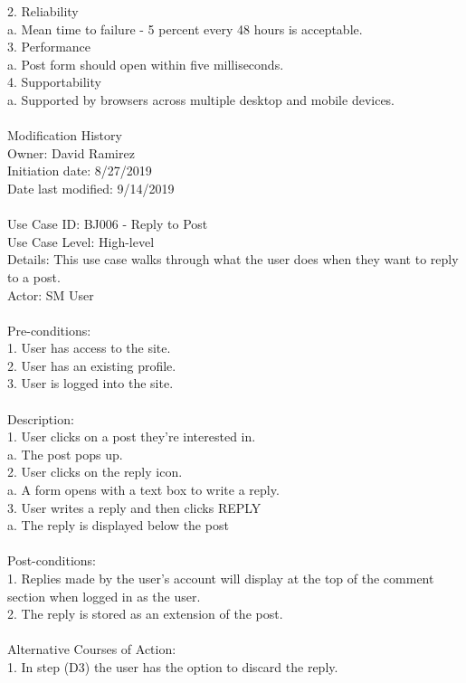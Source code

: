 \documentclass{report}
\begin{document}
2.	Reliability\\
	a.	Mean time to failure - 5 percent every 48 hours is acceptable.\\
3.	Performance\\
	a.	Post form should open within five milliseconds.\\
4.	Supportability\\
	a.	Supported by browsers across multiple desktop and mobile devices.\\
\\
Modification History\\
     Owner: David Ramirez\\
     Initiation date: 8/27/2019\\
     Date last modified: 9/14/2019\\
\\
Use Case ID: BJ006 - Reply to Post\\
Use Case Level: High-level\\
Details: This use case walks through what the user does when they want to reply to a post.\\
Actor: SM User\\
\\
Pre-conditions: \\
1.	User has access to the site.\\
2.	User has an existing profile.\\
3.	User is logged into the site.\\
\\
Description: \\
1.	User clicks on a post they’re interested in. \\
	a.	The post pops up.\\
2.	User clicks on the reply icon. \\
	a.	A form opens with a text box to write a reply.\\
3.	User writes a reply and then clicks REPLY\\
	a.	The reply is displayed below the post   \\
\\
Post-conditions: \\
1.	Replies made by the user’s account will display at the top of the comment section when logged in as the user.\\
2.	The reply is stored as an extension of the post.\\
\\
Alternative Courses of Action:\\
1.	In step (D3) the user has the option to discard the reply.\\
\end{document}
